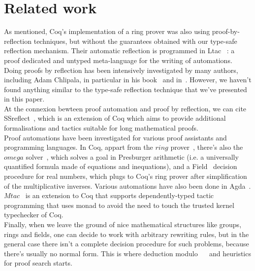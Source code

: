 \section{Related work}
\label{sect:relatedWork}

As mentioned, Coq's implementation of a ring prover was also using proof-by-reflection techniques, but without the guarantees obtained with our type-safe reflection mechanism. Their automatic reflection is programmed in Ltac~\cite{DelahayeLTac} : a proof dedicated and untyped meta-language for the writing of automations. \\

Doing proofs by reflection has been intensively investigated by many authors, including Adam Chlipala, in particular in his book~\cite{ChlipalaBook} and in~\cite{Malecha14}. However, we haven't found anything similar to the type-safe reflection technique that we've presented in this paper. \\

At the connexion bewteen proof automation and proof by reflection, we can cite SSreflect~\cite{GonthierTuto}, which is an extension of Coq which aims to provide additional formalisations and tactics suitable for long mathematical proofs. \\

Proof automations have been investigated for various proof assistants and programming languages. In Coq, appart from the $ring$ prover~\cite{Coq2005}, there's also the $omega$ solver~\cite{Cregut04}, which solves a goal in Presburger arithmetic (i.e. a universally quantified formula made of equations and inequations), and a Field~\cite{DelahayeField} decision procedure for real numbers, which plugs to Coq's ring prover after simplification of the multiplicative inverses. Various automations have also been done in Agda~\cite{Lindblad04}. \\

$Mtac$~\cite{Ziliani13} is an extension to Coq that supports dependently-typed tactic programming that uses monad to avoid the need to touch the trusted kernel typechecker of Coq. \\

Finally, when we leave the ground of nice mathematical structures like groups, rings and fields, one can decide to work with arbitrary rewriting rules, but in the general case there isn't a complete decision procedure for such problems, because there's usually no normal form. This is where deduction modulo~\cite{Dowek03} ~\cite{DelahayeModulo} and heuristics for proof search starts.